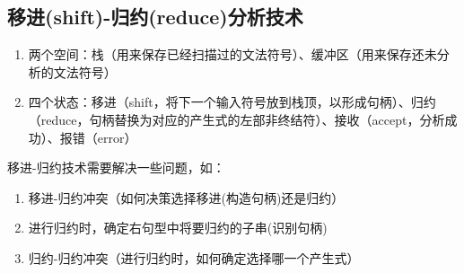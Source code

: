 \documentclass[]{report}
\begin{document}
		\subsection{移进(shift)-归约(reduce)分析技术}
		\begin{enumerate}
			\item 两个空间：栈（用来保存已经扫描过的文法符号）、缓冲区（用来保存还未分析的文法符号）
			\item 四个状态：移进（shift，将下一个输入符号放到栈顶，以形成句柄）、归约（reduce，句柄替换为对应的产生式的左部非终结符）、接收（accept，分析成功）、报错（error）
		\end{enumerate}
		移进-归约技术需要解决一些问题，如：
		\begin{enumerate}
			\item 移进-归约冲突（如何决策选择移进(构造句柄)还是归约）
			\item 进行归约时，确定右句型中将要归约的子串(识别句柄)
			\item 归约-归约冲突（进行归约时，如何确定选择哪一个产生式）
		\end{enumerate}
\end{document}
